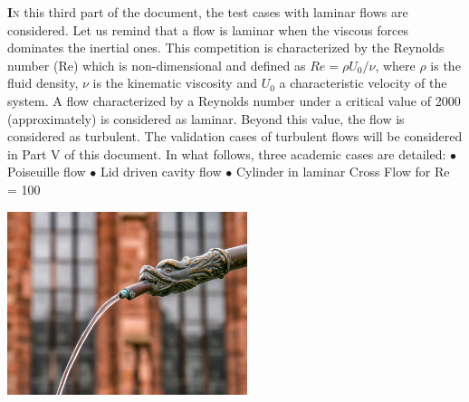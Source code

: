 \vspace*{1.5cm}
\lettrine[lines=2,slope=0pt,nindent=4pt]{\textbf{I}}{n} this third part of the document,
the test cases with laminar flows are considered.
Let us remind that a flow is laminar when the viscous forces dominates the inertial ones. 
This competition is characterized by the Reynolds number (Re) which is non-dimensional and
defined as $Re=\rho U_{0}/\nu$, where $\rho$ is the fluid density, $\nu$
is the kinematic viscosity and $U_{0}$ a characteristic velocity of the system.
A flow characterized by a Reynolds number under a critical value of 2000 (approximately)
is considered as laminar. Beyond this value, the flow is considered as turbulent.
The validation cases of turbulent flows will be considered in Part V of this document. In what
follows, three academic cases are detailed:\vspace*{0.5cm}\newline
\hspace*{0.5cm} $\bullet$ Poiseuille flow\vspace*{0.5cm}\newline
\hspace*{0.5cm} $\bullet$ Lid driven cavity flow\vspace*{0.5cm}\newline
\hspace*{0.5cm} $\bullet$ Cylinder in laminar Cross Flow for Re = 100\vspace*{3cm}\newline
\begin{center}\includegraphics[width=7cm]{tools/jet_laminaire.jpg}\end{center}
